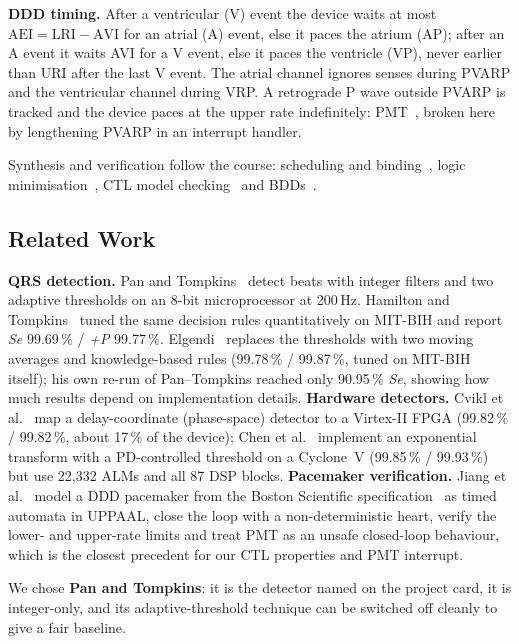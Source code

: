 \documentclass[11pt,a4paper]{article}
\newcommand{\Se}{\textit{Se}}
\newcommand{\Pp}{\textit{+P}}
\begin{document}
\textbf{DDD timing.} After a ventricular (V) event the device waits at most
$\mathrm{AEI}=\mathrm{LRI}-\mathrm{AVI}$ for an atrial (A) event, else it paces the atrium (AP);
after an A event it waits AVI for a V event, else it paces the ventricle (VP), never earlier than URI
after the last V event. The atrial channel ignores senses during PVARP and the ventricular channel
during VRP. A retrograde P wave outside PVARP is tracked and the device paces at the upper rate
indefinitely: PMT~\cite{jiang_tacas}, broken here by lengthening PVARP in an interrupt handler.

Synthesis and verification follow the course: scheduling and binding~\cite{demicheli,paulin,kurdahi},
logic minimisation~\cite{brayton,sis}, CTL model checking~\cite{clarke,nusmv} and BDDs~\cite{bryant,rudell}.

\subsection{Related Work}
\textbf{QRS detection.} Pan and Tompkins~\cite{pan} detect beats with integer filters and two
adaptive thresholds on an 8-bit microprocessor at 200\,Hz. Hamilton and Tompkins~\cite{hamilton}
tuned the same decision rules quantitatively on MIT-BIH and report \Se{} 99.69\,\% /
\Pp{} 99.77\,\%. Elgendi~\cite{elgendi} replaces the thresholds with two moving averages and
knowledge-based rules (99.78\,\% / 99.87\,\%, tuned on MIT-BIH itself); his own re-run of
Pan--Tompkins reached only 90.95\,\% \Se, showing how much results depend on implementation details. \textbf{Hardware detectors.} Cvikl et
al.~\cite{cvikl} map a delay-coordinate (phase-space) detector to a Virtex-II FPGA (99.82\,\% /
99.82\,\%, about 17\,\% of the device); Chen et al.~\cite{chen} implement an exponential transform
with a PD-controlled threshold on a Cyclone~V (99.85\,\% / 99.93\,\%) but use 22{,}332 ALMs and all 87
DSP blocks. \textbf{Pacemaker verification.} Jiang et al.~\cite{jiang_tacas} model a DDD pacemaker
from the Boston Scientific specification~\cite{bsc} as timed automata in UPPAAL, close the loop with
a non-deterministic heart, verify the lower- and upper-rate limits and treat PMT as an unsafe
closed-loop behaviour, which is the closest precedent for our CTL properties and PMT interrupt.

We chose \textbf{Pan and Tompkins}: it is the detector named on the project card, it is integer-only,
and its adaptive-threshold technique can be switched off cleanly to give a fair baseline.
\end{document}
